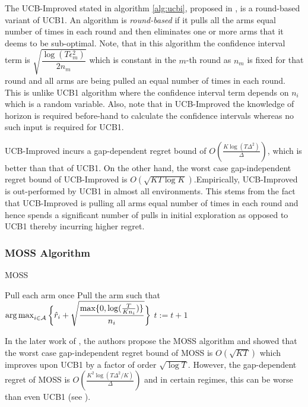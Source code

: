     The UCB-Improved  stated in algorithm \ref{alg:ucbi}, proposed in \citet{auer2010ucb}, is a round-based variant of UCB1. An algorithm is \textit{round-based} if it pulls all the arms equal number of times in each round and then eliminates one or more arms that it deems to be sub-optimal. Note, that in this algorithm the confidence interval term is $\sqrt{\dfrac{\log{( T\epsilon_{m}^{2})}}{2 n_{m}}}$ which is constant in the $m$-th round as $n_m$ is fixed for that round and all arms are being pulled an equal number of times in each round. This is unlike UCB1 algorithm where the confidence interval term depends on $n_i$ which is a random variable. Also, note that in UCB-Improved the knowledge of horizon is required before-hand to calculate the confidence intervals whereas no such input is required for UCB1.
    
    UCB-Improved incurs a gap-dependent regret bound of $O\left(\frac{K\log (T\Delta^{2})}{\Delta}\right)$, which is better than that of UCB1. On the other hand, the worst case gap-independent regret bound of UCB-Improved is $O\left(\sqrt{KT\log K}\right)$.Empirically, UCB-Improved is out-performed by UCB1 in almost all environments. This stems from the fact that UCB-Improved is pulling all arms equal number of times in each round and hence spends a significant number of pulls in initial exploration as opposed to UCB1 thereby incurring higher regret.
        
    
\subsubsection{MOSS Algorithm}    

\begin{algorithm}[!th]
\caption{MOSS}
\label{alg:moss}
\begin{algorithmic}[1]
\State Pull each arm once
\State Pull the arm such that $\operatorname*{arg\,max}_{i\in \mathcal{A}}\bigg\lbrace\hat{r}_{i} + \sqrt{\dfrac{\max\lbrace 0,\log(\frac{T}{K n_i})\rbrace}{n_i}}\bigg\rbrace$
\State $t:=t+1 $
 \EndFor
\end{algorithmic}
\end{algorithm}
    
    In the later work of \citet{audibert2009minimax}, the authors propose the MOSS algorithm and showed that the worst case gap-independent regret bound of MOSS is $O\left( \sqrt{KT} \right)$ which improves upon UCB1 by a factor of order $\sqrt{\log T}$. However, the gap-dependent regret of MOSS is $O\left( \frac{K^{2}\log\left(T\Delta^{2}/K\right)}{\Delta}\right)$ and in certain regimes, this can be worse than even UCB1 (see \citet{audibert2009minimax,lattimore2015optimally}).
    
